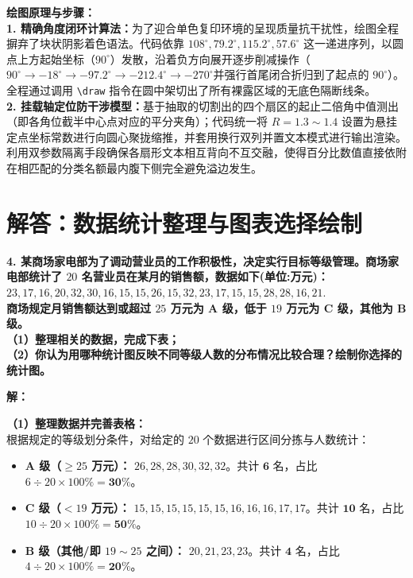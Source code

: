 \vspace{0.6cm}

{\small\color{blue!70!black}
\textbf{绘图原理与步骤：}\\
\textbf{1. 精确角度闭环计算法：}为了迎合单色复印环境的呈现质量抗干扰性，绘图全程摒弃了块状阴影着色语法。代码依靠 $108^\circ, 79.2^\circ, 115.2^\circ, 57.6^\circ$ 这一递进序列，以圆点上方起始坐标（$90^\circ$）发散，沿着负方向展开逐步削减操作（$90^\circ \to -18^\circ \to -97.2^\circ \to -212.4^\circ \to -270^\circ$并强行首尾闭合折归到了起点的 $90^\circ$）。全程通过调用 \texttt{\textbackslash draw} 指令在圆中架切出了所有裸露区域的无底色隔断线条。\\
\textbf{2. 挂载轴定位防干涉模型：}基于抽取的切割出的四个扇区的起止二倍角中值测出（即各角位截半中心点对应的平分夹角）；代码统一将 $R=1.3 \sim 1.4$ 设置为悬挂定点坐标常数进行向圆心聚拢缩推，并套用换行双列并置文本模式进行输出渲染。利用双参数隔离手段确保各扇形文本相互背向不互交融，使得百分比数值直接依附在相匹配的分类名额最内腹下侧完全避免溢边发生。
}

\newpage



\section{解答：数据统计整理与图表选择绘制}

\vspace{0.6cm}

\textbf{4. 某商场家电部为了调动营业员的工作积极性，决定实行目标等级管理。商场家电部统计了 $20$ 名营业员在某月的销售额，数据如下(单位:万元)：}\\
$23,17,16,20,32,30,16,15,15,26,15,32,23,17,15,15,28,28,16,21.$\\
\textbf{商场规定月销售额达到或超过 $25$ 万元为 A 级，低于 $19$ 万元为 C 级，其他为 B 级。}\\
\textbf{（1）整理相关的数据，完成下表；}\\
\textbf{（2）你认为用哪种统计图反映不同等级人数的分布情况比较合理？绘制你选择的统计图。}

\vspace{0.4cm}

\textbf{解：}

\textbf{（1）整理数据并完善表格：} \\
根据规定的等级划分条件，对给定的 $20$ 个数据进行区间分拣与人数统计：
\begin{itemize}
  \item \textbf{A 级（$\geqslant 25$ 万元）：} $26, 28, 28, 30, 32, 32$。共计 $\boldsymbol{6}$ 名，占比 $6 \div 20 \times 100\% = \boldsymbol{30\%}$。
  \item \textbf{C 级（$< 19$ 万元）：} $15, 15, 15, 15, 15, 15, 16, 16, 16, 17, 17$。共计 $\boldsymbol{10}$ 名，占比 $10 \div 20 \times 100\% = \boldsymbol{50\%}$。
  \item \textbf{B 级（其他/即 $19 \sim 25$ 之间）：} $20, 21, 23, 23$。共计 $\boldsymbol{4}$ 名，占比 $4 \div 20 \times 100\% = \boldsymbol{20\%}$。
\end{itemize}

